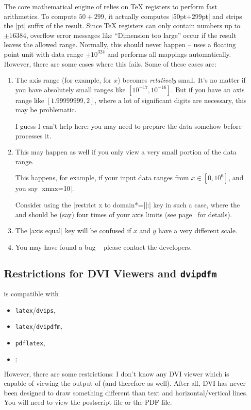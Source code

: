 The core mathematical engine of \PGF{} relies on \TeX{} registers to perform
fast arithmetics. To compute $50+299$, it actually computes |50pt+299pt| and
strips the |pt| suffix of the result. Since \TeX{} registers can only contain
numbers up to $\pm 16384$, overflow error messages like ``Dimension too large''
occur if the result leaves the allowed range. Normally, this should never
happen -- \PGFPlots{} uses a floating point unit with data range $\pm 10^{324}$
and performs all mappings automatically. However, there are some cases where
this fails. Some of these cases are:
%
\begin{enumerate}
    \item The axis range (for example, for $x$) becomes \emph{relatively}
        small. It's no matter if you have absolutely small ranges like
        $[10^{-17},10^{-16}]$. But if you have an axis range like
        $[1.99999999,2]$, where a lot of significant digits are necessary,
        this may be problematic.

        I guess I can't help here: you may need to prepare the data somehow
        before \PGFPlots{} processes it.
    \item This may happen as well if you only view a very small portion of
        the data range.

        This happens, for example, if your input data ranges from $x\in
        [0,10^6]$, and you say |xmax=10|.

        Consider using the |restrict x to domain*=||:|
        key in such a case, where the  and  should be
        (say) four times of your axis limits (see
        page~\pageref{key:restrict:x:to:domain} for details).
    \item The |axis equal| key will be confused if $x$ and $y$ have a very
        different scale.
    \item You may have found a bug -- please contact the developers.
\end{enumerate}


\subsection{Restrictions for DVI Viewers and \texttt{dvipdfm}}
\label{sec:drivers}

\PGF{} is compatible with
%
\begin{itemize}
    \item \lstinline!latex!/\lstinline!dvips!,
    \item \lstinline!latex!/\lstinline!dvipdfm!,
    \item \lstinline!pdflatex!,
    \item $\vdots$
\end{itemize}
%
However, there are some restrictions: I don't know any DVI viewer which is
capable of viewing the output of \PGF{} (and therefore \PGFPlots{} as well).
After all, DVI has never been designed to draw something different than text
and horizontal/vertical lines. You will need to view the postscript file or the
PDF file.

